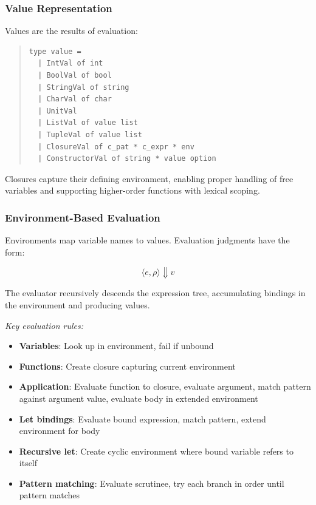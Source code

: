 \documentclass[conference,onecolumn]{IEEEtran}
\begin{document}
\subsubsection{Value Representation}

Values are the results of evaluation:

\begin{quote}
\small
\begin{verbatim}
type value =
  | IntVal of int
  | BoolVal of bool
  | StringVal of string
  | CharVal of char
  | UnitVal
  | ListVal of value list
  | TupleVal of value list
  | ClosureVal of c_pat * c_expr * env
  | ConstructorVal of string * value option
\end{verbatim}
\end{quote}

Closures capture their defining environment, enabling proper handling of free variables and supporting higher-order functions with lexical scoping.

\subsubsection{Environment-Based Evaluation}

Environments map variable names to values. Evaluation judgments have the form:

$$\langle e, \rho \rangle \Downarrow v$$

The evaluator recursively descends the expression tree, accumulating bindings in the environment and producing values.

\textit{Key evaluation rules:}

\begin{itemize}
\item \textbf{Variables}: Look up in environment, fail if unbound
\item \textbf{Functions}: Create closure capturing current environment
\item \textbf{Application}: Evaluate function to closure, evaluate argument, match pattern against argument value, evaluate body in extended environment
\item \textbf{Let bindings}: Evaluate bound expression, match pattern, extend environment for body
\item \textbf{Recursive let}: Create cyclic environment where bound variable refers to itself
\item \textbf{Pattern matching}: Evaluate scrutinee, try each branch in order until pattern matches
\end{itemize}
\end{document}
